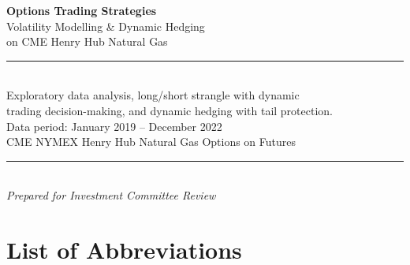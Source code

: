 \documentclass[11pt,a4paper]{article}
\begin{document}
\begin{titlepage}
\centering
\vspace*{3cm}
{\Huge\bfseries\color{darkblue} Options Trading Strategies\\[0.5cm]}
{\LARGE\color{darkblue} Volatility Modelling \& Dynamic Hedging\\[0.3cm]}
{\Large\color{darkblue} on CME Henry Hub Natural Gas\\[2cm]}
\rule{\textwidth}{1pt}\\[1cm]
{\large Exploratory data analysis, long/short strangle with dynamic\\
trading decision-making, and dynamic hedging with tail protection.\\[1cm]}
{\large Data period: January 2019 -- December 2022\\[0.5cm]}
{\large CME NYMEX Henry Hub Natural Gas Options on Futures\\[2cm]}
\rule{\textwidth}{1pt}\\[1cm]
{\large\itshape Prepared for Investment Committee Review}
\vfill
\end{titlepage}

\tableofcontents
\newpage

\section*{List of Abbreviations}
\end{document}
